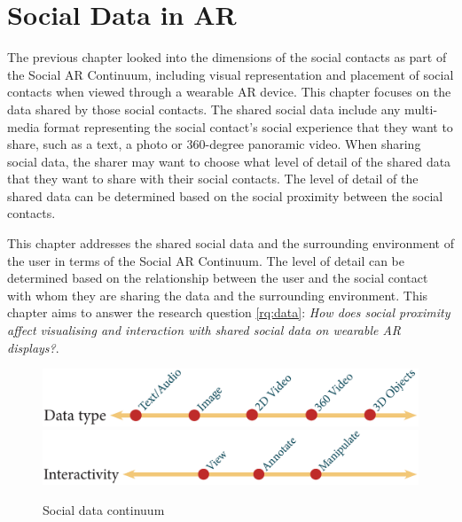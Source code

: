 \chapter{Social Data in AR} 
\label{ch:data} 


The previous chapter looked into the dimensions of the social contacts as part of the Social AR Continuum, including visual representation and placement of social contacts when viewed through a wearable AR device. This chapter focuses on the data shared by those social contacts. The shared social data include any multi-media format representing the social contact's social experience that they want to share, such as a text, a photo or 360-degree panoramic video. When sharing social data, the sharer may want to choose what level of detail of the shared data that they want to share with their social contacts. The level of detail of the shared data can be determined based on the social proximity between the social contacts. 

This chapter addresses the shared social data and the surrounding environment of the user in terms of the Social AR Continuum. The level of detail can be determined based on the relationship between the user and the social contact with whom they are sharing the data and the surrounding environment. This chapter aims to answer the research question \ref{rq:data}: \textit{How does social proximity affect visualising and interaction with shared social data on wearable AR displays?}. 


\begin{figure}[ht]
  \centering
  \includegraphics[width=\columnwidth]{images/30-continuum/continuum4_2-03.eps}
  \includegraphics[width=\columnwidth]{images/30-continuum/continuum4_2-04.eps}
  \caption{Social data continuum}
  \label{fig:surrounding:data-continuum}
\end{figure}

